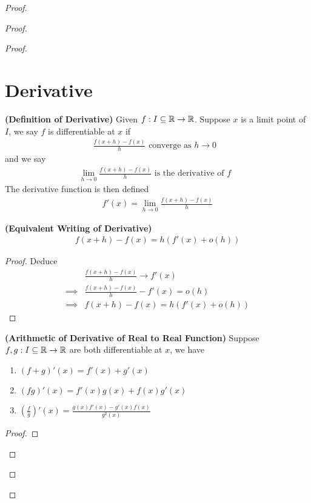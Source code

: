 \documentclass{report}
\begin{document}
\begin{proof}
\begin{proof}
\begin{proof}
\section{Derivative}
\begin{definition}
\label{6.1.1}
\textbf{(Definition of Derivative)} Given $f:I\subseteq \mathbb{R}\rightarrow \mathbb{R}$. Suppose $x$ is a limit point of  $I$, we say  $f$ is differentiable at $x$ if 
 \begin{align*}
\frac{f(x+h)-f(x)}{h}\text{ converge as $h \to 0$ }
\end{align*}
and we say 
\begin{align*}
\lim_{h \to 0} \frac{f(x+h)-f(x)}{h}\text{ is the derivative of $f$ }
\end{align*}
The derivative function is then defined 
\begin{align*}
f'(x)=\lim_{h \to 0}\frac{f(x+h)-f(x)}{h}
\end{align*}
\end{definition}
\begin{theorem}
\label{6.1.2}
\textbf{(Equivalent Writing of Derivative)}
\begin{align*}
f(x+h)-f(x)=h(f'(x)+o(h))
\end{align*}
\end{theorem}
\begin{proof}
Deduce
\begin{align*}
&\frac{f(x+h)-f(x)}{h}\to f'(x)\\
\implies & \frac{f(x+h)-f(x)}{h}-f'(x) = o(h)\\
\implies &f(x+h)-f(x)=h(f'(x)+o(h))
\end{align*}
\end{proof}
\begin{theorem}
\label{6.1.3}
\textbf{(Arithmetic of Derivative of Real to Real Function)} Suppose $f,g:I\subseteq \mathbb{R}\rightarrow \mathbb{R}$ are both differentiable at $x$, we have 
\begin{enumerate}[label=(\alph*)]
  \item $ (f+g)'(x)=f'(x)+g'(x)$
  \item $(fg)'(x)=f'(x)g(x)+f(x)g'(x)$ 
  \item $(\frac{f}{g})'(x)=\frac{g(x)f'(x)-g'(x)f(x)}{g^2(x)}$
\end{enumerate}
\end{theorem}
\begin{proof}

\end{proof}
\end{proof}
\end{proof}
\end{proof}
\end{document}
